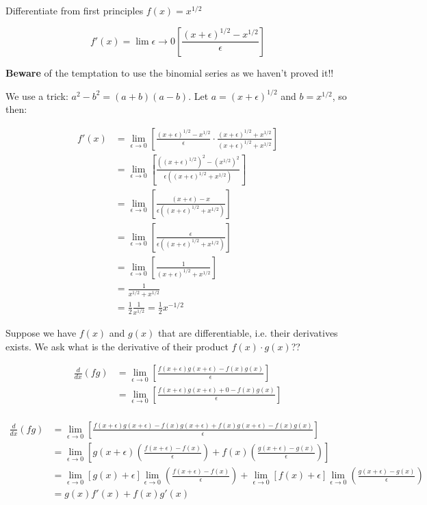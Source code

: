 \documentclass[twoside]{scrartcl}
\begin{document}
\begin{example}
Differentiate from first principles $f(x) = x^{1/2}$

\[f'(x) = \lim{\epsilon \to 0}\left[\frac{(x+\epsilon)^{1/2} - x^{1/2}}{\epsilon}\right]\]	

\textbf{Beware} of the temptation to use the binomial series as we haven't proved it!!

We use a trick: $a^2 -b^2 = (a+b)(a-b)$. Let $a = (x + \epsilon)^{1/2}$ and $b = x^{1/2}$, so then:

\[
\begin{aligned}
  f'(x) &= \lim_{\epsilon \to 0}\left[\frac{(x+\epsilon)^{1/2} - x^{1/2}}{\epsilon}\cdot \frac{(x+\epsilon)^{1/2} + x^{1/2}}{(x+\epsilon)^{1/2} + x^{1/2}}\right]\\
  &= \lim_{\epsilon \to 0}\left[\frac{((x+\epsilon)^{1/2})^2 - (x^{1/2})^2}{\epsilon((x+\epsilon)^{1/2} + x^{1/2})}\right]\\
  &= \lim_{\epsilon \to 0} \left[\frac{(x+\epsilon) - x}{\epsilon((x+\epsilon)^{1/2} + x^{1/2})}\right]\\
  &= \lim_{\epsilon \to 0}\left[\frac{\epsilon}{\epsilon((x + \epsilon)^{1/2} + x^{1/2})}\right]\\
  &= \lim_{\epsilon \to 0} \left[\frac{1}{(x + \epsilon)^{1/2} + x^{1/2}}\right]\\
  &= \frac{1}{x^{1/2} + x^{1/2}}\\ 
  &= \frac{1}{2}\frac{1}{x^{1/2}} = \frac{1}{2}x^{-1/2}
\end{aligned}
\]
\end{example}\vspace*{5pt}


Suppose we have $f(x)$ and $g(x)$ that are differentiable, i.e. their derivatives exists. We ask what is the derivative of their product $f(x)\cdot g(x)$??


\[
\begin{aligned}
  \frac{d}{dx}(fg) &= \lim_{\epsilon \to 0}\left[\frac{f(x +\epsilon)g(x+\epsilon)-f(x)g(x)}{\epsilon}\right]\\
  &= \lim_{\epsilon \to 0}\left[\frac{f(x +\epsilon)g(x+\epsilon) +0 -f(x)g(x)}{\epsilon}\right]\\
\end{aligned}
\]


\[
\begin{aligned}
   \frac{d}{dx}(fg) &= \lim_{\epsilon \to 0}\left[\frac{f(x +\epsilon)g(x+\epsilon) - f(x)g(x+\epsilon) + f(x)g(x + \epsilon) -f(x)g(x)}{\epsilon}\right]\\[0.2cm]
  &= \lim_{\epsilon \to 0}\left[g(x+\epsilon)\left(\frac{f(x+\epsilon)-f(x)}{\epsilon}\right) + f(x)\left(\frac{g(x+\epsilon) -g(x)}{\epsilon}\right)\right]\\[0.2cm]
  &= \lim_{\epsilon \to 0}[g(x)+\epsilon]\lim_{\epsilon \to 0}\left(\frac{f(x+\epsilon)-f(x)}{\epsilon}\right) +  \lim_{\epsilon \to 0}[f(x)+\epsilon]\lim_{\epsilon \to 0}\left(\frac{g(x+\epsilon)-g(x)}{\epsilon}\right) \\[0.2cm]
  &= g(x)f'(x) + f(x)g'(x)
\end{aligned}
\]
\end{document}

